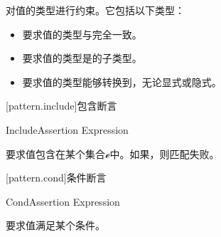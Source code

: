 \pnum
{}对值的类型进行约束。它包括以下类型：

\begin{itemize}
    \item {}要求值的类型与完全一致。
    \item {}要求值的类型是的子类型。
    \item {}要求值的类型能够转换到，无论显式或隐式。
    \end{itemize}

[pattern.include]{包含断言}

\begin{bnf}{IncludeAssertion}
     Expression
\end{bnf}

\pnum
{}要求值包含在某个集合$\mathcal{e}$中。如果，则匹配失败。

[pattern.cond]{条件断言}

\begin{bnf}{CondAssertion}
     Expression
\end{bnf}

\pnum
{}要求值满足某个条件。